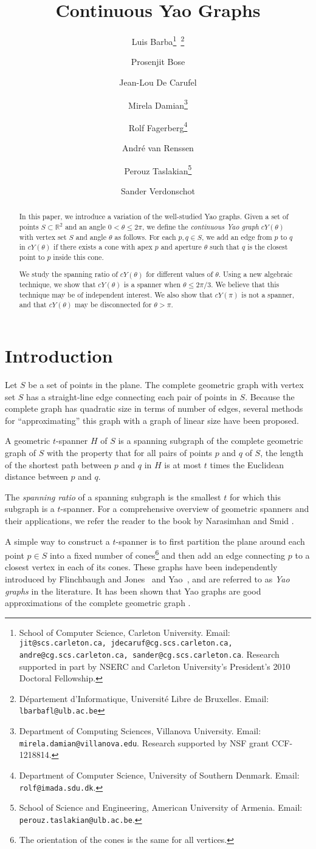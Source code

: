 \documentclass{cccg14}
\title{Continuous Yao Graphs}
\author{
Luis Barba\thanks{School of Computer Science, Carleton University. Email: \texttt{jit@scs.carleton.ca, jdecaruf@cg.scs.carleton.ca, andre@cg.scs.carleton.ca, sander@cg.scs.carleton.ca}. Research supported in part by NSERC and Carleton University's President's 2010 Doctoral Fellowship.}\ \thanks{D\'epartement d'Informatique, Universit\'e Libre de Bruxelles. Email:  \texttt{lbarbafl@ulb.ac.be}}
\and
Prosenjit Bose\footnotemark[1]
\and
Jean-Lou De Carufel\footnotemark[1]
\and
Mirela Damian\thanks{Department of Computing Sciences, Villanova University. Email: \texttt{mirela.damian@villanova.edu}. Research supported by NSF grant CCF-1218814.}
\and
Rolf Fagerberg\thanks{Department of Computer Science, University of Southern Denmark. Email: \texttt{rolf@imada.sdu.dk}.}
\and
Andr\'e van Renssen\footnotemark[1]
\and
Perouz Taslakian\thanks{School of Science and Engineering, American University of Armenia. Email: \texttt{perouz.taslakian@ulb.ac.be}.}
\and
Sander Verdonschot\footnotemark[1]
}
\newcommand{\cyao}{\ensuremath{cY(\theta)}\xspace}
\newcommand{\cyaopi}{\ensuremath{cY(\pi)}\xspace}
\begin{document}
\thispagestyle{empty}
\maketitle

\begin{abstract}
In this paper, we introduce a variation of the well-studied Yao graphs.
Given a set of points $S\subset \mathbb{R}^2$ and an angle $0 < \theta \leq 2\pi$,
we define the \emph{continuous Yao graph} $\cyao$ with vertex set $S$ and angle $\theta$ as follows. For each $p,q\in S$, we add an edge from $p$ to $q$ in $\cyao$ 
if there exists a cone with apex $p$ and aperture $\theta$ such that $q$ is the closest point to $p$ inside this cone.

We study the spanning ratio of \cyao for different values of $\theta$.
Using a new algebraic technique, we show that $\cyao$ is a spanner when $\theta \leq 2\pi /3$. We believe that this technique may be of independent interest. We also show that $\cyaopi$ is not a spanner, and that $\cyao$ may be disconnected for $\theta > \pi$.

\end{abstract}

\section{Introduction}
Let $S$ be a set of points in the plane.
The complete geometric graph with vertex set $S$ has a straight-line edge connecting each pair of points in $S$. 
Because the complete graph has quadratic size in terms of number of edges, several methods for ``approximating'' this graph with a graph of linear size have been proposed. 

A geometric $t$-spanner $H$ of $S$ is a spanning subgraph of the complete geometric graph of $S$ with the property that for all pairs of points $p$ and $q$ of $S$, the length of the shortest path between $p$ and $q$ in $H$ is at most $t$ times the Euclidean distance between $p$ and $q$.

The \emph{spanning ratio} of a spanning subgraph is the smallest $t$ for which this subgraph is a $t$-spanner. For a comprehensive overview of geometric spanners and their applications, we refer the reader to the book by Narasimhan and Smid \cite{NS06}.

A simple way to construct a $t$-spanner is to first partition the plane around each point $p\in S$ into a fixed number of cones\footnote{The orientation of the cones is the same for all vertices.} and then add an edge connecting $p$ to a closest vertex in each of its cones. These graphs have been independently introduced by Flinchbaugh and Jones~\cite{flinchbaugh1981strong} and Yao~\cite{yao1982constructing}, and are referred to as \emph{Yao graphs} in the literature.
It has been shown that Yao graphs are good approximations of the complete geometric graph
\cite{clarkson1987approximation,althofer1993sparse,bose2004approximating,bose2012piArxiv,damian2012yao,bose2012pi,el2009yao,barba2014new}.
\end{document}
